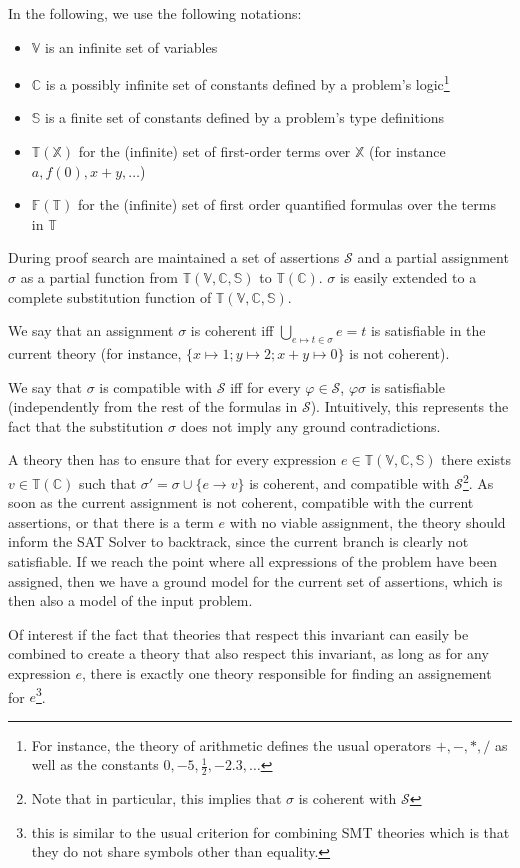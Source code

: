 In the following, we use the following notations:
\begin{itemize}
  \item $\mathbb{V}$ is an infinite set of variables
  \item $\mathbb{C}$ is a possibly infinite set of constants defined
    by a problem's logic\footnote{For instance, the theory of arithmetic
    defines the usual operators $+, -, *, /$ as well as the constants
    $0, -5, \frac{1}{2}, -2.3, \ldots$}
  \item $\mathbb{S}$ is a finite set of constants defined by a problem's type definitions
  \item $\mathbb{T}(\mathbb{X})$ for the (infinite) set of first-order terms over $\mathbb{X}$
    (for instance $a, f(0), x + y, \ldots$)
  \item $\mathbb{F}(\mathbb{T})$ for the (infinite) set of first order quantified formulas
    over the terms in $\mathbb{T}$
\end{itemize}

During proof search are maintained a set of assertions $\mathcal{S}$
and a partial assignment $\sigma$ as a partial function from $\mathbb{T}(\mathbb{V, C, S})$
to $\mathbb{T}(\mathbb{C})$. $\sigma$ is easily extended to a complete substitution function of
$\mathbb{T}(\mathbb{V, C, S})$.

We say that an assignment $\sigma$ is coherent iff $\bigcup_{e\mapsto t \in \sigma} e = t$ is satisfiable
in the current theory (for instance, $\{x\mapsto 1; y \mapsto 2; x + y \mapsto 0\}$ is not coherent).

We say that $\sigma$ is compatible with $\mathcal{S}$ iff for every $\varphi \in \mathcal{S}$,
$\varphi\sigma$ is satisfiable (independently from the rest of the formulas in $\mathcal{S}$).
Intuitively, this represents the fact that the substitution $\sigma$ does not imply any
ground contradictions.

A theory then has to ensure that for every expression $e \in \mathbb{T}(\mathbb{V,C,S})$
there exists $v \in \mathbb{T}(\mathbb{C})$ such that $\sigma' = \sigma \cup \{ e \rightarrow v \}$
is coherent, and compatible with $\mathcal{S}$\footnote{Note that in particular, this implies
that $\sigma$ is coherent with $\mathcal{S}$}. As soon as the current assignment is not coherent,
compatible with the current assertions, or that there is a term $e$ with no viable assignment, the theory
should inform the SAT Solver to backtrack, since the current branch is clearly not satisfiable.
If we reach the point where all expressions of the problem have been assigned, then we
have a ground model for the current set of assertions, which is then also a model
of the input problem.

Of interest if the fact that theories that respect this invariant can easily be combined
to create a theory that also respect this invariant, as long as for any expression $e$,
there is exactly one theory responsible for finding an assignement for $e$\footnote{this
is similar to the usual criterion for combining SMT theories which is that they do not
share symbols other than equality.}.

